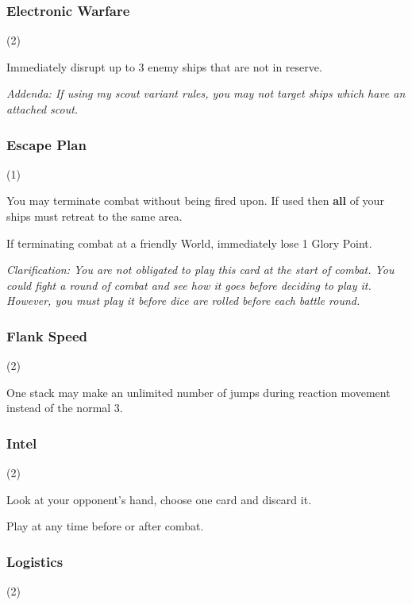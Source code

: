 \subsubsection{Electronic Warfare} (2)


Immediately disrupt up to 3 enemy ships that are not in reserve.

\textit{Addenda: If using my scout variant rules, you may not target ships which have an attached scout.}

\subsubsection{Escape Plan} (1)


You may terminate combat without being fired upon. If used then \textbf{all} of your ships must retreat to the same area.

If terminating combat at a friendly World, immediately lose 1 Glory Point.

\textit{Clarification: You are not obligated to play this card at the start of combat. You could fight a round of combat and see how it goes before deciding to play it. However, you must play it before dice are rolled before each battle round.}

\subsubsection{Flank Speed} (2)


One stack may make an unlimited number of jumps during reaction movement instead of the normal 3.

\subsubsection{Intel} (2)


Look at your opponent's hand, choose one card and discard it.

Play at any time before or after combat.

\subsubsection{Logistics} (2)

